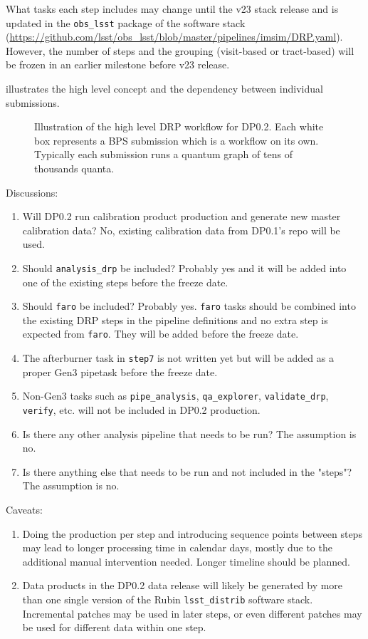What tasks each step includes may change until the v23 stack release and is updated in the \texttt{obs\_lsst} package of the software stack (\url{https://github.com/lsst/obs_lsst/blob/master/pipelines/imsim/DRP.yaml}).
However, the number of steps and the grouping (visit-based or tract-based) will be frozen in an earlier milestone before v23 release.

 illustrates the high level concept and the dependency between individual submissions.

\begin{figure}
\begin{center}

\end{center}
\caption{Illustration of the high level DRP workflow for DP0.2. Each white box represents a BPS submission which is a workflow on its own. Typically each submission runs a quantum graph of tens of thousands quanta.
\label{fig:highLevelWorkflow}}
\end{figure}

Discussions:
\begin{enumerate}
  \item Will DP0.2 run calibration product production and generate new master calibration data? No, existing calibration data from DP0.1's repo will be used.
  \item Should \texttt{analysis\_drp} be included? Probably yes and it will be added into one of the existing steps before the freeze date.
  \item Should \texttt{faro} be included? Probably yes. \texttt{faro} tasks should be combined into the existing DRP steps in the pipeline definitions and no extra step is expected from \texttt{faro}. They will be added before the freeze date.
  \item The afterburner task in \texttt{step7} is not written yet but will be added as a proper Gen3 pipetask before the freeze date.
  \item Non-Gen3 tasks such as \texttt{pipe\_analysis}, \texttt{qa\_explorer}, \texttt{validate\_drp}, \texttt{verify}, etc. will not be included in DP0.2 production.
  \item Is there any other analysis pipeline that needs to be run? The assumption is no.
  \item Is there anything else that needs to be run and not included in the "steps"? The assumption is no.
\end{enumerate}

Caveats:
\begin{enumerate}
  \item Doing the production per step and introducing sequence points between steps may lead to longer processing time in calendar days, mostly due to the additional manual intervention needed. Longer timeline should be planned.
  \item Data products in the DP0.2 data release will likely be generated by more than one single version of the Rubin \texttt{lsst\_distrib} software stack. Incremental patches may be used in later steps, or even different patches may be used for different data within one step.
\end{enumerate}

